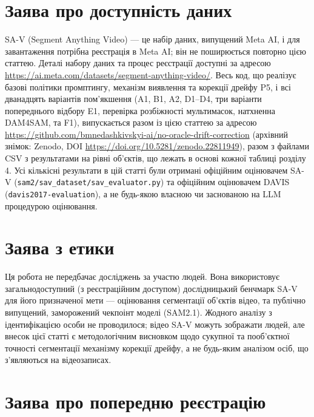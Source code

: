 \documentclass[11pt]{article}
\begin{document}
\section*{Заява про доступність даних}

SA-V (Segment Anything Video) --- це набір даних, випущений Meta AI, і для завантаження потрібна реєстрація в Meta AI; він не поширюється повторно цією статтею. Деталі набору даних та процес реєстрації доступні за адресою \url{https://ai.meta.com/datasets/segment-anything-video/}. Весь код, що реалізує базові політики промптингу, механізм виявлення та корекції дрейфу P5, і всі дванадцять варіантів пом'якшення (A1, B1, A2, D1--D4, три варіанти попереднього відбору E1, перевірка розбіжності мультимасок, натхненна DAM4SAM, та F1), випускається разом із цією статтею за адресою \url{https://github.com/bmnedashkivskyi-ai/no-oracle-drift-correction} (архівний знімок: Zenodo, DOI \url{https://doi.org/10.5281/zenodo.22811949}), разом з файлами CSV з результатами на рівні об'єктів, що лежать в основі кожної таблиці розділу 4. Усі кількісні результати в цій статті були отримані офіційним оцінювачем SA-V (\texttt{sam2/sav\_dataset/sav\_evaluator.py}) та офіційним оцінювачем DAVIS (\texttt{davis2017-evaluation}), а не будь-якою власною чи заснованою на LLM процедурою оцінювання.

\section*{Заява з етики}

Ця робота не передбачає досліджень за участю людей. Вона використовує загальнодоступний (з реєстраційним доступом) дослідницький бенчмарк SA-V для його призначеної мети --- оцінювання сегментації об'єктів відео, та публічно випущений, заморожений чекпоінт моделі (SAM2.1). Жодного аналізу з ідентифікацією особи не проводилося; відео SA-V можуть зображати людей, але внесок цієї статті є методологічним висновком щодо сукупної та пооб'єктної точності сегментації механізму корекції дрейфу, а не будь-яким аналізом осіб, що з'являються на відеозаписах.

\section*{Заява про попередню реєстрацію}
\end{document}
